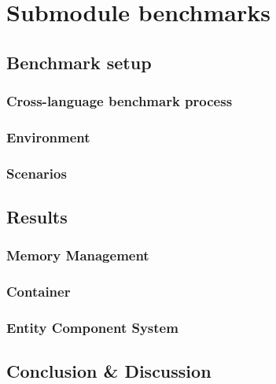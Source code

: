 \chapter{Submodule benchmarks}
\blindtext
\section{Benchmark setup}
\blindtext
\subsection{Cross-language benchmark process}
\blindtext
\subsection{Environment}
\blindtext
\subsection{Scenarios}
\blindtext
\section{Results}
\blindtext
\subsection{Memory Management}
\blindtext
\subsection{Container}
\blindtext
\subsection{Entity Component System}
\blindtext
\section{Conclusion \& Discussion}
\blindtext